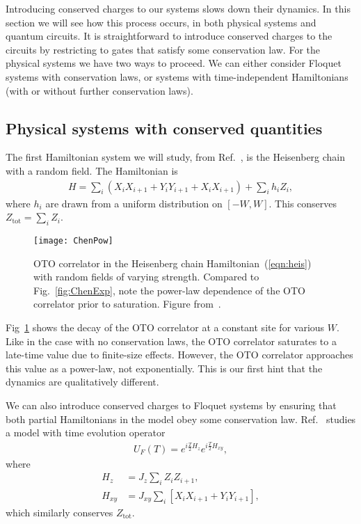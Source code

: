 \documentclass[a4paper,11pt]{article}
\newcommand{\tot}{\text{tot}}
\newcommand{\nn}{\nonumber\\}
\begin{document}
Introducing conserved charges to our systems slows down their dynamics. In this section we will see how this process occurs, in both physical systems and quantum circuits. It is straightforward to introduce conserved charges to the circuits by restricting to gates that satisfy some conservation law. For the physical systems we have two ways to proceed. We can either consider Floquet systems with conservation laws, or systems with time-independent Hamiltonians (with or without further conservation laws).

\subsection{Physical systems with conserved quantities} \label{sub:fcons}

The first Hamiltonian system we will study, from Ref.~\cite{ChenOtoc}, is the Heisenberg chain with a random field. The Hamiltonian is
\begin{align}
H = \sum_i\left(X_iX_{i+1} + Y_iY_{i+1} + X_iX_{i+1}\right)+\sum_i h_iZ_i,
	\label{eqn:heis}
\end{align}
where ${h_i}$ are drawn from a uniform distribution on $[-W,W]$. This conserves $Z_\tot=\sum_i Z_i$. 
\begin{figure}
	\centering
	\texttt{[image: ChenPow]}
	\caption{OTO correlator in the Heisenberg chain Hamiltonian~(\ref{eqn:heis}) with random fields of varying strength. Compared to Fig.~\ref{fig:ChenExp}, note the power-law dependence of the OTO correlator prior to saturation. Figure from~\cite{ChenOtoc}.}
	\label{fig:ChenPow}
\end{figure}
Fig~\ref{fig:ChenPow} shows the decay of the OTO correlator at a constant site for various $W$. Like in the case with no conservation laws, the OTO correlator saturates to a late-time value due to finite-size effects. However, the OTO correlator approaches this value as a power-law, not exponentially. This is our first hint that the dynamics are qualitatively different.

We can also introduce conserved charges to Floquet systems by ensuring that both partial Hamiltonians in the model obey some conservation law. Ref.~\cite{KhemaniOpSp} studies a model with time evolution operator
\begin{align}
U_F(T)=e^{i\frac{T}{2}H_z}e^{i\frac{T}{2}H_{xy}}, \label{fig:khemFloq}
\end{align}
where
\begin{align}
H_z &= J_z\sum_i Z_iZ_{i+1},\nn
H_{xy} &= J_{xy}\sum_i\left[X_iX_{i+1}+Y_iY_{i+1}\right],
\end{align}
which similarly conserves $Z_\tot$.
\end{document}
